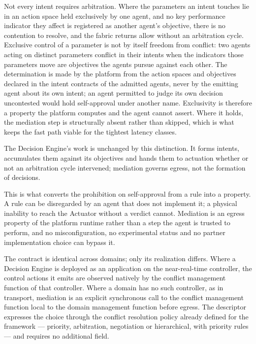 Not every intent requires arbitration. Where the parameters an intent
touches lie in an action space held exclusively by one agent, and no key
performance indicator they affect is registered as another agent's
objective, there is no contention to resolve, and the fabric returns
allow without an arbitration cycle. Exclusive control of a parameter is
not by itself freedom from conflict: two agents acting on distinct
parameters conflict in their intents when the indicators those
parameters move are objectives the agents pursue against each other. The
determination is made by the platform from the action spaces and
objectives declared in the intent contracts of the admitted agents,
never by the emitting agent about its own intent; an agent permitted to
judge its own decision uncontested would hold self-approval under
another name. Exclusivity is therefore a property the platform computes
and the agent cannot assert. Where it holds, the mediation step is
structurally absent rather than skipped, which is what keeps the fast
path viable for the tightest latency classes.

The Decision Engine's work is unchanged by this distinction. It forms
intents, accumulates them against its objectives and hands them to
actuation whether or not an arbitration cycle intervened; mediation
governs egress, not the formation of decisions.

This is what converts the prohibition on self-approval from a rule into
a property. A rule can be disregarded by an agent that does not
implement it; a physical inability to reach the Actuator without a
verdict cannot. Mediation is an egress property of the platform runtime
rather than a step the agent is trusted to perform, and no
misconfiguration, no experimental status and no partner implementation
choice can bypass it.

The contract is identical across domains; only its realization differs.
Where a Decision Engine is deployed as an application on the
near-real-time controller, the control actions it emits are observed
natively by the conflict management function of that controller. Where a
domain has no such controller, as in transport, mediation is an explicit
synchronous call to the conflict management function local to the domain
management function before egress. The descriptor expresses the choice
through the conflict resolution policy already defined for the framework
--- priority, arbitration, negotiation or hierarchical, with priority
rules --- and requires no additional field.

